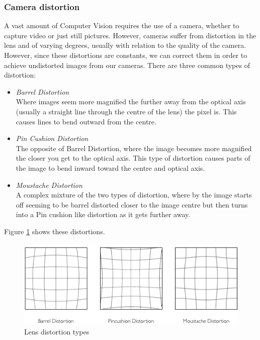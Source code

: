 \documentclass[11pt]{article}
\begin{document}
\subsubsection{Camera distortion}
A vast amount of Computer Vision requires the use of a camera, whether to 
capture video or just still pictures. However, cameras suffer from distortion
in the lens and of varying degrees, usually with relation to the quality
of the camera. However, since these distortions are constants, we can
correct them in order to achieve undistorted images from our cameras.
There are three common types of distortion:
\begin{itemize}
	\item \textit{Barrel Distortion} \\
			Where images seem more magnified the further away from the optical
			axis (usually a straight line through the centre of the lens) 
			the pixel is. This causes lines to bend outward from the centre.
	\item \textit{Pin Cushion Distortion} \\
			The opposite of Barrel Distortion, where the image becomes more 
			magnified the closer you get to the optical axis. This type of
			distortion causes parts of the image to bend inward toward the 
			centre and optical axis.
	\item \textit{Moustache Distortion} \\
			A complex mixture of the two types of distortion, where by the 
			image starts off seeming to be barrel distorted closer to the
			image centre but then turns into a Pin cushion like distortion
			as it gets further away.
\end{itemize}

Figure \ref{fig:distortions} shows these distortions.

\begin{figure}
	\centering
	\includegraphics[scale=0.8]{pics/distortions.png}
	\caption{Lens distortion types}
	\label{fig:distortions}
\end{figure}
\end{document}
